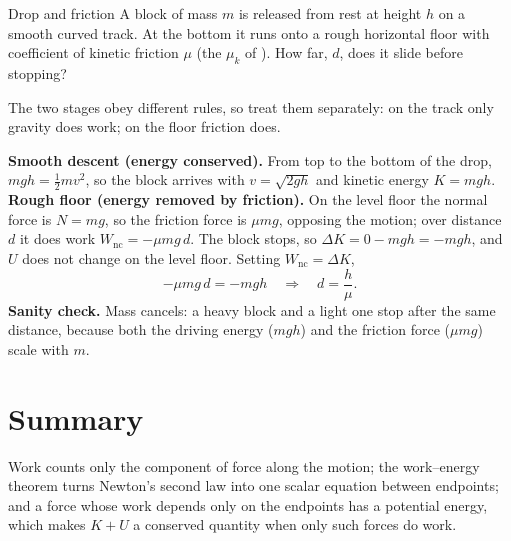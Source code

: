 \begin{figure}[htbp]
\centering
{}
\end{figure}

\begin{exbox}{Drop and friction}
A block of mass $m$ is released from rest at height $h$ on a smooth curved track. At the bottom it runs
onto a rough horizontal floor with coefficient of kinetic friction $\mu$ (the $\mu_k$ of
). How far, $d$, does it slide before stopping?

The two stages obey different rules, so treat them separately: on the track only gravity does work; on
the floor friction does.

 \textbf{Smooth descent (energy conserved).} From top to the bottom of the drop,
$mgh=\tfrac12 mv^2$, so the block arrives with $v=\sqrt{2gh}$ and kinetic energy $K=mgh$.
 \textbf{Rough floor (energy removed by friction).} On the level floor the normal force is
$N=mg$, so the friction force is $\mu mg$, opposing the motion; over distance $d$ it does work
$W_{\text{nc}}=-\mu mg\,d$. The block stops, so $\Delta K=0-mgh=-mgh$, and $U$ does not change on the
level floor. Setting $W_{\text{nc}}=\Delta K$,
\[
-\mu mg\,d=-mgh\quad\Longrightarrow\quad d=\frac{h}{\mu}.
\]
 \textbf{Sanity check.} Mass cancels: a heavy block and a light one stop after the same
distance, because both the driving energy ($mgh$) and the friction force ($\mu mg$) scale with $m$.
\end{exbox}

\section{Summary}\label{sec:summary11}
Work counts only the component of force along the motion; the work--energy theorem turns Newton's second
law into one scalar equation between endpoints; and a force whose work depends only on the endpoints has
a potential energy, which makes $K+U$ a conserved quantity when only such forces do work.

